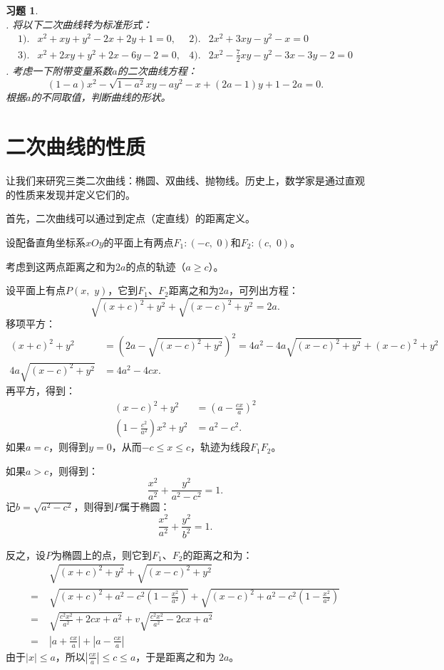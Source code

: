 \documentclass[12pt,UTF8]{ctexbook}
\theoremstyle{definition}
\theoremstyle{plain}
\newtheorem{xt}{习题}[section]
\begin{document}
\begin{xt}
    \mbox{} \\
    . 将以下二次曲线转为标准形式：
    \begin{align*}
        1).& x^2 + xy +y^2 - 2x + 2y + 1 = 0,  &2).& 2x^2 + 3xy -y^2 - x = 0 \\
        3).& x^2 + 2xy + y^2 + 2x - 6y - 2 = 0,  & 4).& 2x^2 - \frac{7}{2}xy - y^2 - 3x - 3y - 2 = 0 
    \end{align*}
    . 考虑一下附带变量系数$a$的二次曲线方程：
    $$ (1 - a)x^2 - \sqrt{1 - a^2}xy - ay^2 - x + (2a - 1)y + 1 - 2a = 0. $$
    根据$a$的不同取值，判断曲线的形状。
\end{xt}

\section{二次曲线的性质}

让我们来研究三类二次曲线：椭圆、双曲线、抛物线。历史上，数学家是通过直观的性质来发现并定义它们的。

首先，二次曲线可以通过到定点（定直线）的距离定义。

设配备直角坐标系$xOy$的平面上有两点$F_1:(-c,\,\,0)$和$F_2:(c,\,\,0)$。

考虑到这两点距离之和为$2a$的点的轨迹（$a\geqslant c$）。

设平面上有点$P(x, \,\,y)$，它到$F_1$、$F_2$距离之和为$2a$，可列出方程：
$$ \sqrt{(x + c)^2 + y^2} + \sqrt{(x - c)^2 + y^2} = 2a.$$
移项平方：
\begin{align*}
    (x + c)^2 + y^2 &= (2a - \sqrt{(x - c)^2 + y^2})^2 = 4a^2 - 4a\sqrt{(x - c)^2 + y^2} + (x - c)^2 + y^2 \\
    4a\sqrt{(x - c)^2 + y^2} &= 4a^2 - 4cx.
\end{align*}
再平方，得到：
\begin{align*}
    (x - c)^2 + y^2 &= \left(a - \frac{cx}{a}\right)^2 \\
    (1 - \frac{c^2}{a^2})x^2 + y^2 &= a^2 - c^2.
\end{align*}
如果$a = c$，则得到$y = 0$，从而$-c \leqslant x \leqslant c$，轨迹为线段$F_1F_2$。

如果$a > c$，则得到：
$$ \frac{x^2}{a^2} + \frac{y^2}{a^2 - c^2} = 1.$$
记$b = \sqrt{a^2 - c^2}$，则得到$P$属于椭圆：
$$ \frac{x^2}{a^2} + \frac{y^2}{b^2} = 1.$$

反之，设$P$为椭圆上的点，则它到$F_1$、$F_2$的距离之和为：
\begin{align*}
    &\;\sqrt{(x + c)^2 + y^2} + \sqrt{(x - c)^2 + y^2}  \\
    =&\;\sqrt{(x + c)^2 + a^2 - c^2\left(1 - \frac{x^2}{a^2}\right)} + \sqrt{(x - c)^2 + a^2 - c^2\left(1 - \frac{x^2}{a^2}\right)} \\
    =&\;\sqrt{\frac{c^2x^2}{a^2} + 2cx + a^2} + v\sqrt{\frac{c^2x^2}{a^2} - 2cx + a^2} \\
    =&\; \left|a + \frac{cx}{a}\right| + \left|a - \frac{cx}{a}\right|
\end{align*}
由于$|x| \leqslant a$，所以$\displaystyle\left|\frac{cx}{a}\right| \leqslant c \leqslant a$，于是距离之和为
$2a$。
\end{document}
